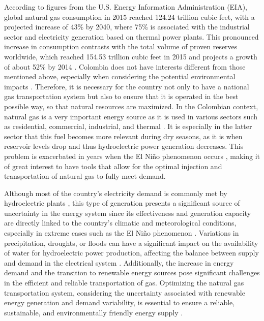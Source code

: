     According to figures from the U.S. Energy Information Administration (EIA), global natural gas consumption in 2015 reached 124.24 trillion cubic feet, with a projected increase of 43\% by 2040, where 75\% is associated with the industrial sector and electricity generation based on thermal power plants. This pronounced increase in consumption contrasts with the total volume of proven reserves worldwide, which reached 154.53 trillion cubic feet in 2015 and projects a growth of about 52\% by 2014 \cite{eia}. Colombia does not have interests different from those mentioned above, especially when considering the potential environmental impacts \cite{ideam}. Therefore, it is necessary for the country not only to have a national gas transportation system but also to ensure that it is operated in the best possible way, so that natural resources are maximized. In the Colombian context, natural gas is a very important energy source as it is used in various sectors such as residential, commercial, industrial, and thermal \cite{creg_2021}. It is especially in the latter sector that this fuel becomes more relevant during dry seasons, as it is when reservoir levels drop and thus hydroelectric power generation decreases. This problem is exacerbated in years when the El Niño phenomenon occurs \cite{paper-col}, making it of great interest to have tools that allow for the optimal injection and transportation of natural gas to fully meet demand.

    Although most of the country's electricity demand is commonly met by hydroelectric plants \cite{xm-generacion}, this type of generation presents a significant source of uncertainty in the energy system since its effectiveness and generation capacity are directly linked to the country's climatic and meteorological conditions, especially in extreme cases such as the El Niño phenomenon \cite{fenomeno_niño}. Variations in precipitation, droughts, or floods can have a significant impact on the availability of water for hydroelectric power production, affecting the balance between supply and demand in the electrical system \cite{Ignacio_Fariza_2022}. Additionally, the increase in energy demand and the transition to renewable energy sources pose significant challenges in the efficient and reliable transportation of gas. Optimizing the natural gas transportation system, considering the uncertainty associated with renewable energy generation and demand variability, is essential to ensure a reliable, sustainable, and environmentally friendly energy supply \cite{Shan_Yu_Gong_Huang_Wen_Wang_Ren_Wang_Shi_Liu_2023}.
    

